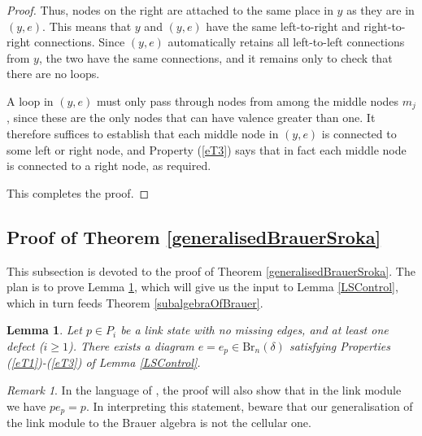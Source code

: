 \documentclass[12pt]{amsart}
\theoremstyle{plain}
\theoremstyle{definition} \newtheorem{definition}[theorem]{Definition}
\theoremstyle{plain}
\newtheorem{lemma}[theorem]{Lemma}
\theoremstyle{plain} \newtheorem{proposition}[theorem]{Proposition}
\theoremstyle{plain} \newtheorem{conjecture}[theorem]{Conjecture}
\theoremstyle{plain} \newtheorem{corollary}[theorem]{Corollary}
\theoremstyle{remark} \newtheorem{claim}[theorem]{Claim}
\theoremstyle{remark} \newtheorem{remark}[theorem]{Remark}
\theoremstyle{remark} \newtheorem{example}[theorem]{Example}
\theoremstyle{remark} \newtheorem{comment}[theorem]{Comment}
\theoremstyle{definition} \newtheorem{question}[theorem]{Question}
\newcommand{\Brauer}{\mathrm{Br}}
\begin{document}
\begin{proof}
Thus, nodes on the right are attached to the same place in $y$ as they are in $(y,e)$. This means that $y$ and $(y,e)$ have the same left-to-right and right-to-right connections. Since $(y,e)$ automatically retains all left-to-left connections from $y$, the two have the same connections, and it remains only to check that there are no loops.

A loop in $(y,e)$ must only pass through nodes from among the middle nodes $m_j$, since these are the only nodes that can have valence greater than one. It therefore suffices to establish that each middle node in $(y,e)$ is connected to some left or right node, and Property (\ref{eT3}) says that in fact each middle node is connected to a right node, as required.

This completes the proof. \end{proof}

\subsection{Proof of Theorem \ref{generalisedBrauerSroka}} \label{subsectionSrokaBrauer}

This subsection is devoted to the proof of Theorem \ref{generalisedBrauerSroka}. The plan is to prove Lemma \ref{easyTrundle}, which will give us the input to Lemma \ref{LSControl}, which in turn feeds Theorem \ref{subalgebraOfBrauer}.

\begin{lemma} \label{easyTrundle} Let $p \in P_i$ be a link state with no missing edges, and at least one defect ($i \geq 1$). There exists a diagram $e = e_p \in \Brauer_n(\delta)$ satisfying Properties (\ref{eT1})-(\ref{eT3}) of Lemma \ref{LSControl}. \end{lemma}

\begin{remark} In the language of \cite{RidoutSaintAubin}, the proof will also show that in the link module we have $p e_p = p$. In interpreting this statement, beware that our generalisation of the link module to the Brauer algebra is not the cellular one. \end{remark}
\end{document}
